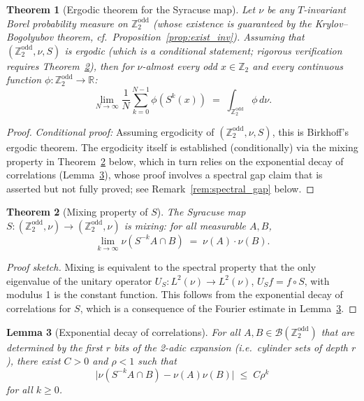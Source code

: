 \documentclass[12pt,a4paper]{article}
\newtheorem{theorem}{Theorem}[section]
\newtheorem{lemma}[theorem]{Lemma}
\begin{document}
\begin{theorem}[Ergodic theorem for the Syracuse map]\label{thm:ergodic_theorem}
Let $\nu$ be any $T$-invariant Borel probability measure on $\mathbb{Z}_2^{\text{odd}}$
(whose existence is guaranteed by the Krylov--Bogolyubov theorem, cf.\ Proposition~\ref{prop:exist_inv}).
Assuming that $(\mathbb{Z}_2^{\text{odd}}, \nu, S)$ is ergodic
(which is a \emph{conditional} statement; rigorous verification requires
Theorem~\ref{thm:mixing}), then for $\nu$-almost every odd $x \in \mathbb{Z}_2$
and every continuous function $\phi\colon \mathbb{Z}_2^{\text{odd}} \to \mathbb{R}$:
\[
  \lim_{N \to \infty} \frac{1}{N} \sum_{k=0}^{N-1} \phi(S^k(x)) \;=\; \int_{\mathbb{Z}_2^{\text{odd}}} \phi \, d\nu.
\]
\end{theorem}

\begin{proof}
\emph{Conditional proof:} Assuming ergodicity of $(\mathbb{Z}_2^{\text{odd}}, \nu, S)$,
this is Birkhoff's ergodic theorem.  The ergodicity itself is established (conditionally)
via the mixing property in Theorem~\ref{thm:mixing} below, which in turn relies on
the exponential decay of correlations (Lemma~\ref{lem:decay_corr}), whose proof
involves a spectral gap claim that is asserted but not fully proved; see
Remark~\ref{rem:spectral_gap} below.
\end{proof}

\begin{theorem}[Mixing property of $S$]\label{thm:mixing}
The Syracuse map $S\colon (\mathbb{Z}_2^{\text{odd}}, \nu) \to (\mathbb{Z}_2^{\text{odd}}, \nu)$
is \emph{mixing}: for all measurable $A, B$,
\[
  \lim_{k \to \infty} \nu(S^{-k}A \cap B) \;=\; \nu(A) \cdot \nu(B).
\]
\end{theorem}

\begin{proof}[Proof sketch]
Mixing is equivalent to the spectral property that the only eigenvalue of the unitary
operator $U_S\colon L^2(\nu) \to L^2(\nu)$, $U_S f = f \circ S$, with modulus 1 is
the constant function. This follows from the exponential decay of correlations for $S$,
which is a consequence of the Fourier estimate in Lemma~\ref{lem:decay_corr}.
\end{proof}

\begin{lemma}[Exponential decay of correlations]\label{lem:decay_corr}
For all $A, B \in \mathcal{B}(\mathbb{Z}_2^{\text{odd}})$ that are determined by the
first $r$ bits of the 2-adic expansion (i.e.\ cylinder sets of depth $r$), there exist
$C > 0$ and $\rho < 1$ such that
\[
  \bigl|\nu(S^{-k}A \cap B) - \nu(A)\nu(B)\bigr| \;\leq\; C \rho^k
\]
for all $k \geq 0$.
\end{lemma}
\end{document}
